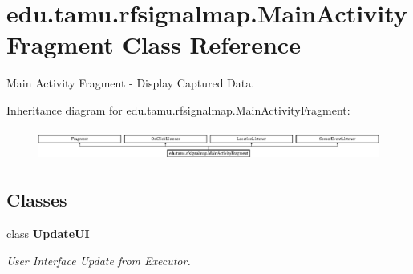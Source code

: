 \hypertarget{classedu_1_1tamu_1_1rfsignalmap_1_1_main_activity_fragment}{}\section{edu.\+tamu.\+rfsignalmap.\+Main\+Activity\+Fragment Class Reference}
\label{classedu_1_1tamu_1_1rfsignalmap_1_1_main_activity_fragment}


Main Activity Fragment -\/ Display Captured Data.  


Inheritance diagram for edu.\+tamu.\+rfsignalmap.\+Main\+Activity\+Fragment\+:\begin{figure}[H]
\begin{center}
\leavevmode
\includegraphics[height=1.048689cm]{classedu_1_1tamu_1_1rfsignalmap_1_1_main_activity_fragment}
\end{center}
\end{figure}
\subsection*{Classes}
\begin{DoxyCompactItemize}
\item 
class {\bfseries Update\+UI}
\begin{DoxyCompactList}\small\item\em User Interface Update from Executor. \end{DoxyCompactList}\end{DoxyCompactItemize}
